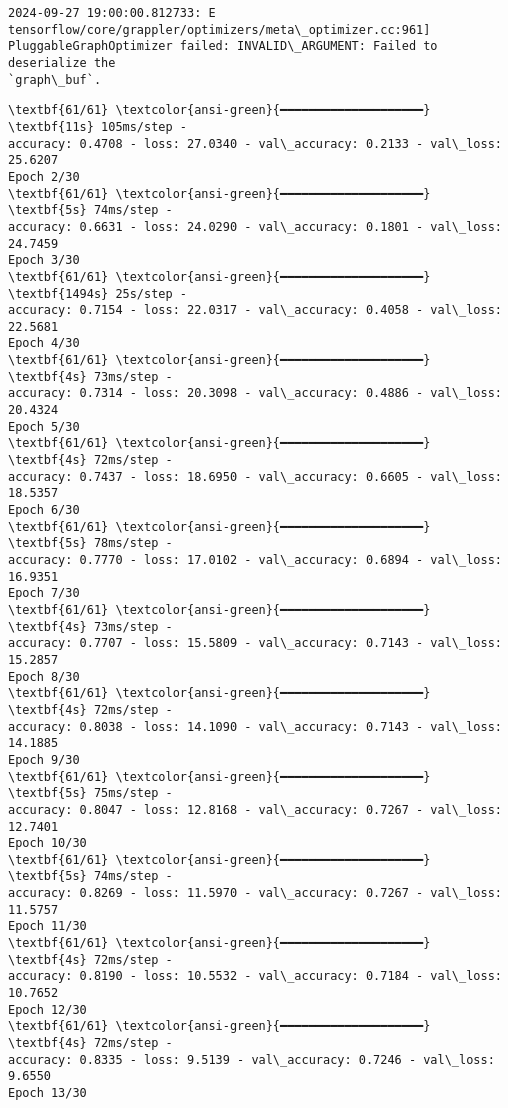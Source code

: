 \documentclass[11pt]{article}
\begin{document}
    \begin{Verbatim}[commandchars=\\\{\}]
2024-09-27 19:00:00.812733: E
tensorflow/core/grappler/optimizers/meta\_optimizer.cc:961]
PluggableGraphOptimizer failed: INVALID\_ARGUMENT: Failed to deserialize the
`graph\_buf`.
    \end{Verbatim}

    \begin{Verbatim}[commandchars=\\\{\}]
\textbf{61/61} \textcolor{ansi-green}{━━━━━━━━━━━━━━━━━━━━} \textbf{11s} 105ms/step -
accuracy: 0.4708 - loss: 27.0340 - val\_accuracy: 0.2133 - val\_loss: 25.6207
Epoch 2/30
\textbf{61/61} \textcolor{ansi-green}{━━━━━━━━━━━━━━━━━━━━} \textbf{5s} 74ms/step -
accuracy: 0.6631 - loss: 24.0290 - val\_accuracy: 0.1801 - val\_loss: 24.7459
Epoch 3/30
\textbf{61/61} \textcolor{ansi-green}{━━━━━━━━━━━━━━━━━━━━} \textbf{1494s} 25s/step -
accuracy: 0.7154 - loss: 22.0317 - val\_accuracy: 0.4058 - val\_loss: 22.5681
Epoch 4/30
\textbf{61/61} \textcolor{ansi-green}{━━━━━━━━━━━━━━━━━━━━} \textbf{4s} 73ms/step -
accuracy: 0.7314 - loss: 20.3098 - val\_accuracy: 0.4886 - val\_loss: 20.4324
Epoch 5/30
\textbf{61/61} \textcolor{ansi-green}{━━━━━━━━━━━━━━━━━━━━} \textbf{4s} 72ms/step -
accuracy: 0.7437 - loss: 18.6950 - val\_accuracy: 0.6605 - val\_loss: 18.5357
Epoch 6/30
\textbf{61/61} \textcolor{ansi-green}{━━━━━━━━━━━━━━━━━━━━} \textbf{5s} 78ms/step -
accuracy: 0.7770 - loss: 17.0102 - val\_accuracy: 0.6894 - val\_loss: 16.9351
Epoch 7/30
\textbf{61/61} \textcolor{ansi-green}{━━━━━━━━━━━━━━━━━━━━} \textbf{4s} 73ms/step -
accuracy: 0.7707 - loss: 15.5809 - val\_accuracy: 0.7143 - val\_loss: 15.2857
Epoch 8/30
\textbf{61/61} \textcolor{ansi-green}{━━━━━━━━━━━━━━━━━━━━} \textbf{4s} 72ms/step -
accuracy: 0.8038 - loss: 14.1090 - val\_accuracy: 0.7143 - val\_loss: 14.1885
Epoch 9/30
\textbf{61/61} \textcolor{ansi-green}{━━━━━━━━━━━━━━━━━━━━} \textbf{5s} 75ms/step -
accuracy: 0.8047 - loss: 12.8168 - val\_accuracy: 0.7267 - val\_loss: 12.7401
Epoch 10/30
\textbf{61/61} \textcolor{ansi-green}{━━━━━━━━━━━━━━━━━━━━} \textbf{5s} 74ms/step -
accuracy: 0.8269 - loss: 11.5970 - val\_accuracy: 0.7267 - val\_loss: 11.5757
Epoch 11/30
\textbf{61/61} \textcolor{ansi-green}{━━━━━━━━━━━━━━━━━━━━} \textbf{4s} 72ms/step -
accuracy: 0.8190 - loss: 10.5532 - val\_accuracy: 0.7184 - val\_loss: 10.7652
Epoch 12/30
\textbf{61/61} \textcolor{ansi-green}{━━━━━━━━━━━━━━━━━━━━} \textbf{4s} 72ms/step -
accuracy: 0.8335 - loss: 9.5139 - val\_accuracy: 0.7246 - val\_loss: 9.6550
Epoch 13/30

\end{Verbatim}
\end{document}
